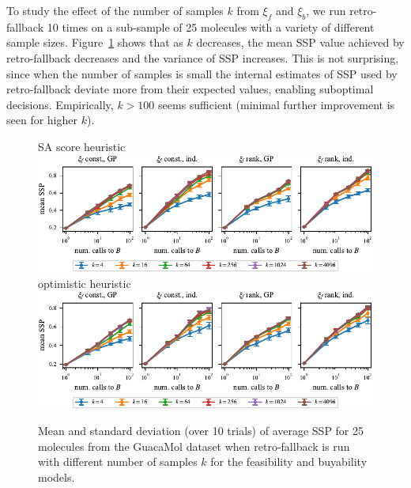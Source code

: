To study the effect of the number of samples $k$ from $\xi_f$ and $\xi_b$,
we run retro-fallback 10 times on a sub-sample of  25 molecules with a variety of different sample sizes.
Figure~\ref{fig:retro-fallback variability} shows that as $k$ decreases, the mean SSP value
achieved by retro-fallback
decreases and the variance of SSP increases.
This is not surprising, since when the number of samples is small
the internal estimates of SSP used by retro-fallback
deviate more from their expected values,
enabling suboptimal decisions.
Empirically, $k>100$ seems sufficient (minimal further improvement is seen for higher $k$).
\begin{figure}[ht]
    \centering
    {SA score heuristic} \\
    \vspace{0.3cm}
    \includegraphics{figures/variation/guacamol/ssp_sascore.pdf} \\
    \vspace{0.3cm}
    {optimistic heuristic} \\
    \vspace{0.3cm}
    \includegraphics{figures/variation/guacamol/ssp_optimistic.pdf} \\
    \caption[Variation of retro-fallback with number of samples.]{
        Mean and standard deviation (over 10 trials)
        of average SSP for 25 molecules
        from the GuacaMol dataset
        when retro-fallback is run with different number
        of samples $k$
        for the feasibility and buyability models.
    }
    \label{fig:retro-fallback variability}
\end{figure}



